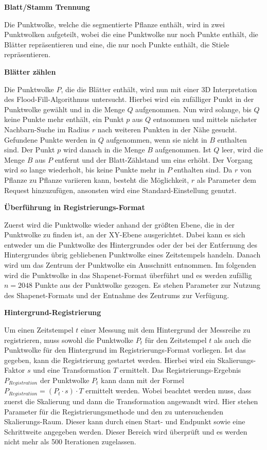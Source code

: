 \documentclass[12pt,titlepage, twoside]{article}
\begin{document}
\textbf{Blatt/Stamm Trennung}

Die Punktwolke, welche die segmentierte Pflanze enthält, wird in zwei Punktwolken aufgeteilt, 
wobei die eine Punktwolke nur noch Punkte enthält, die Blätter repräsentieren und eine, die nur noch Punkte enthält, die Stiele repräsentieren.

\textbf{Blätter zählen}

Die Punktwolke $P$, die die Blätter enthält, wird nun mit einer 3D Interpretation des Flood-Fill-Algorithmus untersucht. 
Hierbei wird ein zufälliger Punkt in der Punktwolke gewählt und in die Menge $Q$ aufgenommen.
Nun wird solange, bis $Q$ keine Punkte mehr enthält, ein Punkt $p$ aus $Q$ entnommen und mittels nächster Nachbarn-Suche im Radius $r$ nach weiteren Punkten in der Nähe gesucht. 
Gefundene Punkte werden in $Q$ aufgenommen, wenn sie nicht in $B$ enthalten sind.
Der Punkt $p$ wird danach in die Menge $B$ aufgenommen. Ist $Q$ leer, wird die Menge $B$ aus $P$ entfernt und der Blatt-Zählstand um eins erhöht. 
Der Vorgang wird so lange wiederholt, bis keine Punkte mehr in $P$ enthalten sind.
Da $r$ von Pflanze zu Pflanze variieren kann, besteht die Möglichkeit, $r$ als Parameter dem Request hinzuzufügen, ansonsten wird eine Standard-Einstellung genutzt.

\textbf{Überführung in Registrierungs-Format }

Zuerst wird die Punktwolke wieder anhand der größten Ebene, die in der Punktwolke zu finden ist, an der XY-Ebene ausgerichtet.
Dabei kann es sich entweder um die Punktwolke des Hintergrundes oder der bei der Entfernung des Hintergrundes übrig gebliebenen Punktwolke eines Zeitstempels handeln.
Danach wird um das Zentrum der Punktwolke ein Ausschnitt entnommen.
Im folgenden wird die Punktwolke in das Shapenet-Format überführt und es werden zufällig $n=2048$ Punkte aus der Punktwolke gezogen.
Es stehen Parameter zur Nutzung des Shapenet-Formats und der Entnahme des Zentrums zur Verfügung.

\textbf{Hintergrund-Registrierung}

Um einen Zeitstempel $t$ einer Messung mit dem Hintergrund der Messreihe zu registrieren, muss sowohl die Punktwolke $P_t$ für den Zeitstempel $t$ als auch die Punktwolke für den Hintergrund im Registrierungs-Format vorliegen.
Ist das gegeben, kann die Registrierung gestartet werden. Hierbei wird ein Skalierungs-Faktor $s$ und eine Transformation $T$ ermittelt. 
Das Registrierungs-Ergebnis $P_{Registration}$ der Punktwolke $P_t$ kann dann mit der Formel $P_{Registration} = (P_t \cdot s) \cdot T$ ermittelt werden. 
Wobei beachtet werden muss, dass zuerst die Skalierung und dann die Transformation angewandt wird. Hier stehen Parameter für die Registrierungsmethode und den zu untersuchenden Skalierungs-Raum.
Dieser kann durch einen Start- und Endpunkt sowie eine Schrittweite angegeben werden. Dieser Bereich wird überprüft und es werden nicht mehr als 500 Iterationen zugelassen. 
\end{document}
